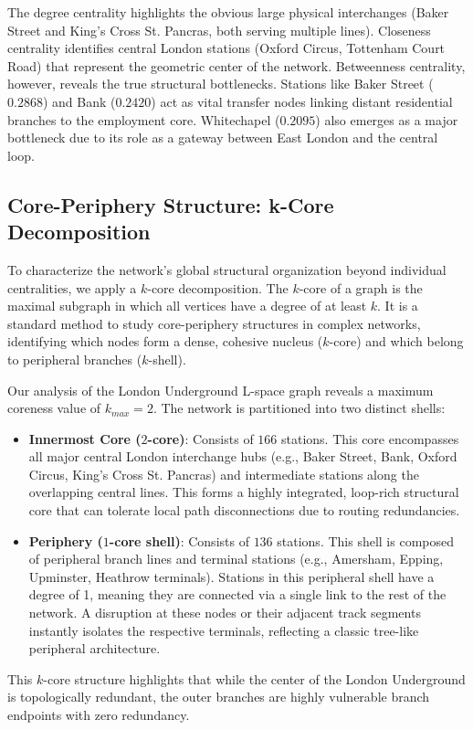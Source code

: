 \documentclass[12pt, a4paper]{article}
\begin{document}
The degree centrality highlights the obvious large physical interchanges (Baker Street and King's Cross St. Pancras, both serving multiple lines). Closeness centrality identifies central London stations (Oxford Circus, Tottenham Court Road) that represent the geometric center of the network. Betweenness centrality, however, reveals the true structural bottlenecks. Stations like Baker Street ($0.2868$) and Bank ($0.2420$) act as vital transfer nodes linking distant residential branches to the employment core. Whitechapel ($0.2095$) also emerges as a major bottleneck due to its role as a gateway between East London and the central loop.

\subsection{Core-Periphery Structure: k-Core Decomposition}
To characterize the network's global structural organization beyond individual centralities, we apply a $k$-core decomposition. The $k$-core of a graph is the maximal subgraph in which all vertices have a degree of at least $k$. It is a standard method to study core-periphery structures in complex networks, identifying which nodes form a dense, cohesive nucleus ($k$-core) and which belong to peripheral branches ($k$-shell).

Our analysis of the London Underground L-space graph reveals a maximum coreness value of $k_{max} = 2$. The network is partitioned into two distinct shells:
\begin{itemize}
    \item \textbf{Innermost Core ($2$-core)}: Consists of $166$ stations. This core encompasses all major central London interchange hubs (e.g., Baker Street, Bank, Oxford Circus, King's Cross St. Pancras) and intermediate stations along the overlapping central lines. This forms a highly integrated, loop-rich structural core that can tolerate local path disconnections due to routing redundancies.
    \item \textbf{Periphery ($1$-core shell)}: Consists of $136$ stations. This shell is composed of peripheral branch lines and terminal stations (e.g., Amersham, Epping, Upminster, Heathrow terminals). Stations in this peripheral shell have a degree of 1, meaning they are connected via a single link to the rest of the network. A disruption at these nodes or their adjacent track segments instantly isolates the respective terminals, reflecting a classic tree-like peripheral architecture.
\end{itemize}
This $k$-core structure highlights that while the center of the London Underground is topologically redundant, the outer branches are highly vulnerable branch endpoints with zero redundancy.
\end{document}
